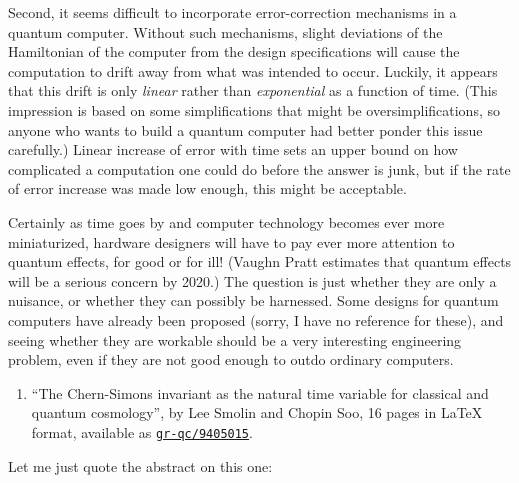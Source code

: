 \documentclass{article}
\def\tightlist{}
\begin{document}
Second, it seems difficult to incorporate error-correction mechanisms in
a quantum computer. Without such mechanisms, slight deviations of the
Hamiltonian of the computer from the design specifications will cause
the computation to drift away from what was intended to occur. Luckily,
it appears that this drift is only \emph{linear} rather than
\emph{exponential} as a function of time. (This impression is based on
some simplifications that might be oversimplifications, so anyone who
wants to build a quantum computer had better ponder this issue
carefully.) Linear increase of error with time sets an upper bound on
how complicated a computation one could do before the answer is junk,
but if the rate of error increase was made low enough, this might be
acceptable.

Certainly as time goes by and computer technology becomes ever more
miniaturized, hardware designers will have to pay ever more attention to
quantum effects, for good or for ill! (Vaughn Pratt estimates that
quantum effects will be a serious concern by 2020.) The question is just
whether they are only a nuisance, or whether they can possibly be
harnessed. Some designs for quantum computers have already been proposed
(sorry, I have no reference for these), and seeing whether they are
workable should be a very interesting engineering problem, even if they
are not good enough to outdo ordinary computers.

\begin{enumerate}
\def\labelenumi{\arabic{enumi})}
\setcounter{enumi}{3}
\tightlist
\item
  ``The Chern-Simons invariant as the natural time variable for
  classical and quantum cosmology'', by Lee Smolin and Chopin Soo, 16
  pages in LaTeX format, available as
  \href{http://xxx.lanl.gov/abs/gr-qc/9405015}{\texttt{gr-qc/9405015}}.
\end{enumerate}

Let me just quote the abstract on this one:
\end{document}
